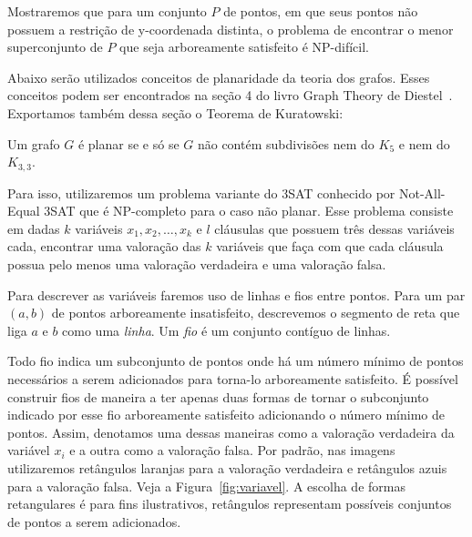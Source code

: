 Mostraremos que para um conjunto $P$ de pontos, em que seus pontos não possuem a restrição de y-coordenada distinta, o problema de encontrar o menor superconjunto de $P$ que seja arboreamente satisfeito é NP-difícil.

Abaixo serão utilizados conceitos de planaridade da teoria dos grafos. Esses conceitos podem ser encontrados na seção 4 do livro Graph Theory de Diestel~\cite{graph}. Exportamos também dessa seção o Teorema de Kuratowski:

\begin{kuratowski}
    Um grafo $G$ é planar se e só se $G$ não contém subdivisões nem do $K_5$ e nem do $K_{3,3}$.
    \label{teorema-kuratowski}
\end{kuratowski}

Para isso, utilizaremos um problema variante do 3SAT conhecido por Not-All-Equal 3SAT que é NP-completo para o caso não planar. Esse problema consiste em dadas $k$ variáveis $x_1, x_2, \ldots, x_k$ e $l$ cláusulas que possuem três dessas variáveis cada, encontrar uma valoração das $k$ variáveis que faça com que cada cláusula possua pelo menos uma valoração verdadeira e uma valoração falsa.

Para descrever as variáveis faremos uso de linhas e fios entre pontos. Para um par $(a,b)$ de pontos arboreamente insatisfeito, descrevemos o segmento de reta que liga $a$ e $b$ como uma \textit{linha}. Um \textit{fio} é um conjunto contíguo de linhas. 

Todo fio indica um subconjunto de pontos onde há um número mínimo de pontos necessários a serem adicionados para torna-lo arboreamente satisfeito. É possível construir fios de maneira a ter apenas duas formas de tornar o subconjunto indicado por esse fio arboreamente satisfeito adicionando o número mínimo de pontos.
Assim, denotamos uma dessas maneiras como a valoração verdadeira da variável $x_i$ e a outra como a valoração falsa. Por padrão, nas imagens utilizaremos retângulos laranjas para a valoração verdadeira e retângulos azuis para a valoração falsa. Veja a Figura~\ref{fig:variavel}. A escolha de formas retangulares é para fins ilustrativos, retângulos representam possíveis conjuntos de pontos a serem adicionados.

